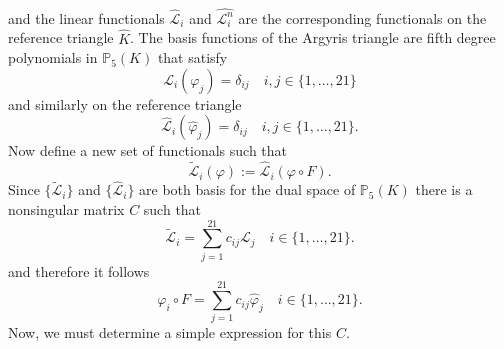 and the linear functionals $\hat{\mathcal{L}}_i$ and $\hat{ \mathcal{L}_i^n}$
are the corresponding functionals on the reference triangle $\hat{K}$. The basis
functions of the Argyris triangle are fifth degree polynomials in
$\mathbb{P}_5(K)$
that satisfy
\begin{equation*}
  \mathcal{L}_i(\varphi_j) = \delta_{ij} \quad i,j\in\{1,\dots,21\}
\end{equation*}
and similarly on the reference triangle
\begin{equation*}
  \hat{\mathcal{L}}_i(\hat{\varphi}_j) = \delta_{ij} \quad
  i,j\in\{1,\dots,21\}.
\end{equation*}
Now define a new set of functionals such that 
\begin{equation}
  \tilde{\mathcal{L}}_i(\varphi) := \hat{\mathcal{L}}_i(\varphi\circ F).
  \label{eqn:Functional}
\end{equation}
Since $\{\tilde{\mathcal{L}}_i\}$ and $\{\hat{\mathcal{L}}_i\}$ are both basis
for the dual space of $\mathbb{P}_5(K)$ there is a nonsingular matrix $C$ such
that 
\begin{equation}
  \tilde{\mathcal{L}}_i = \sum_{j=1}^{21} c_{ij} \mathcal{L}_j \quad i\in
  \{1,\dots,21\}. 
  \label{eqn:FunctionalsC}
\end{equation}
and therefore it follows
\begin{equation}
  \varphi_i\circ F = \sum_{j=1}^{21} c_{ij}\hat{\varphi}_j \quad i\in
  \{1,\dots,21\}. 
  \label{eqn:PolyC}
\end{equation} \cite{Dominguez08}
Now, we must determine a simple expression for this $C$.

